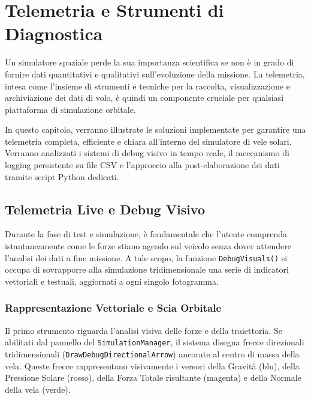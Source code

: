 \chapter{Telemetria e Strumenti di Diagnostica}
\label{chap:telemetria}

Un simulatore spaziale perde la sua importanza scientifica se non è in grado di fornire dati quantitativi e qualitativi sull'evoluzione della missione. La telemetria, intesa come l'insieme di strumenti e tecniche per la raccolta, visualizzazione e archiviazione dei dati di volo, è quindi un componente cruciale per qualsiasi piattaforma di simulazione orbitale.

In questo capitolo, verranno illustrate le soluzioni implementate per garantire una telemetria completa, efficiente e chiara all'interno del simulatore di vele solari. Verranno analizzati i sistemi di debug visivo in tempo reale, il meccanismo di logging persistente su file CSV e l'approccio alla post-elaborazione dei dati tramite script Python dedicati.


\section{Telemetria Live e Debug Visivo}

Durante la fase di test e simulazione, è fondamentale che l'utente comprenda istantaneamente come le forze stiano agendo sul veicolo senza dover attendere l'analisi dei dati a fine missione. A tale scopo, la funzione \lstinline|DebugVisuals()| si occupa di sovrapporre alla simulazione tridimensionale una serie di indicatori vettoriali e testuali, aggiornati a ogni singolo fotogramma.


\subsection{Rappresentazione Vettoriale e Scia Orbitale}

Il primo strumento riguarda l'analisi visiva delle forze e della traiettoria. Se abilitati dal pannello del \lstinline|SimulationManager|, il sistema disegna frecce direzionali tridimensionali (\lstinline|DrawDebugDirectionalArrow|) ancorate al centro di massa della vela. Queste frecce rappresentano visivamente i versori della Gravità (blu), della Pressione Solare (rosso), della Forza Totale risultante (magenta) e della Normale della vela (verde). 

